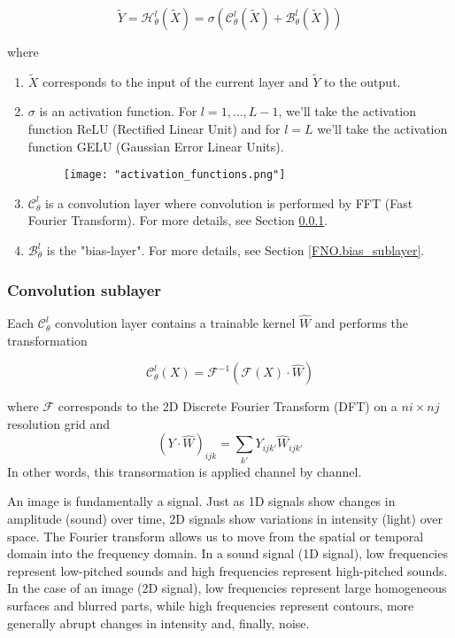 \begin{equation*}
	\tilde{Y}=\mathcal{H}_\theta^l(\tilde{X})=\sigma\left(\mathcal{C}_\theta^l(\tilde{X})+\mathcal{B}_\theta^l(\tilde{X})\right)
\end{equation*}

where
\begin{enumerate}[label=\textbullet]
	\item $\tilde{X}$ corresponds to the input of the current layer and $\tilde{Y}$ to the output.
	\item $\sigma$ is an activation function. For $l=1,\dots,L-1$, we'll take the activation function ReLU (Rectified Linear Unit) and for $l=L$ we'll take the activation function GELU (Gaussian Error Linear Units).
	\begin{figure}[H]
		\centering
		\texttt{[image: "activation\_functions.png"]}
	\end{figure}
	
	\item $\mathcal{C}_\theta^l$ is a convolution layer where convolution is performed by FFT (Fast Fourier Transform). For more details, see Section \ref{FNO.conv_sublayer}.
	\item $\mathcal{B}_\theta^l$ is the "bias-layer". For more details, see Section \ref{FNO.bias_sublayer}.
\end{enumerate}

\subsubsection{Convolution sublayer} \label{FNO.conv_sublayer}

Each $\mathcal{C}_\theta^l$ convolution layer contains a trainable kernel $\hat{W}$ and performs the transformation

\begin{equation*}
	\mathcal{C}_\theta^l(X)=\mathcal{F}^{-1}(\mathcal{F}(X)\cdot\hat{W})
\end{equation*}

where $\mathcal{F}$ corresponds to the 2D Discrete Fourier Transform (DFT) on a $ni\times nj$ resolution grid and
\begin{equation*}
	(Y\cdot\hat{W})_{ijk}=\sum_{k'}Y_{ijk'}\hat{W}_{ijk'}
\end{equation*}
In other words, this transormation is applied channel by channel.

\begin{Rem}
	An image is fundamentally a signal. Just as 1D signals show changes in amplitude (sound) over time, 2D signals show variations in intensity (light) over space. The Fourier transform allows us to move from the spatial or temporal domain into the frequency domain. In a sound signal (1D signal), low frequencies represent low-pitched sounds and high frequencies represent high-pitched sounds. In the case of an image (2D signal), low frequencies represent large homogeneous surfaces and blurred parts, while high frequencies represent contours, more generally abrupt changes in intensity and, finally, noise.
\end{Rem}

